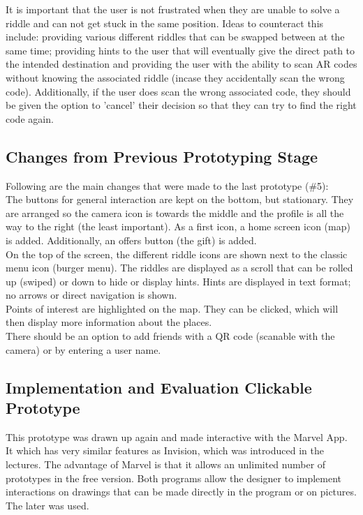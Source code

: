 \documentclass[10pt,twocolumn]{article} %
\begin{document}
It is important that the user is not frustrated when they are unable to solve a riddle and can not get stuck in the same position. Ideas to counteract this include: providing various different riddles that can be swapped between at the same time; providing hints to the user that will eventually give the direct path to the intended destination and providing the user with the ability to scan AR codes without knowing the associated riddle (incase they accidentally scan the wrong code). Additionally, if the user does scan the wrong associated code, they should be given the option to 'cancel' their decision so that they can try to find the right code again.

\subsection*{Changes from Previous Prototyping Stage}
Following are the main changes that were made to the last prototype (\#5): \\

The buttons for general interaction are kept on the bottom, but stationary. They are arranged so the camera icon is towards the middle and the profile is all the way to the right (the least important). As a first icon, a home screen icon (map) is added. Additionally, an offers button (the gift) is added. \\

On the top of the screen, the different riddle icons are shown next to the classic menu icon (burger menu). The riddles are displayed as a scroll that can be rolled up (swiped) or down to hide or display hints. Hints are displayed in text format; no arrows or direct navigation is shown.\\
Points of interest are highlighted on the map. They can be clicked, which will then display more information about the places.\\
There should be an option to add friends with a QR code (scanable with the camera) or by entering a user name. 

\subsection*{Implementation and Evaluation Clickable Prototype}
This prototype was drawn up again and made interactive with the Marvel App. It which has very similar features as Invision, which was introduced in the lectures. The advantage of Marvel is that it allows an unlimited number of prototypes in the free version. Both programs allow the designer to implement interactions on drawings that can be made directly in the program or on pictures. The later was used.
\end{document}
